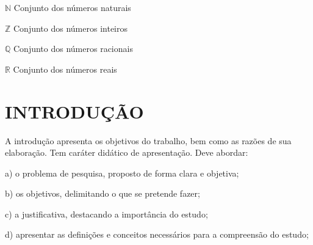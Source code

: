 \documentclass[
	12pt,				%
	oneside,			%
	a4paper,			%
	english,			%
	french,				%
	spanish,			%
	brazil,				%
	]{abntex2}
\newcommand{\C}{\ensuremath {\mathbb{C}} }
\theoremstyle{plain}
\theoremstyle{definition}
\begin{document}
\renewcommand\listadesimbolosname{{\fontsize{12pt}{\baselineskip}\normalfont \bfseries LISTA DE SÍMBOLOS}}
\begin{simbolos}
  \item[$ \mathbb{N} $] Conjunto dos números naturais 
  \item[$ \mathbb{Z} $] Conjunto dos números inteiros 
  \item[$ \mathbb{Q} $] Conjunto dos números racionais 
  \item[$ \mathbb{R} $] Conjunto dos números reais 
\end{simbolos}


\renewcommand\contentsname{{\fontsize{12pt}{\baselineskip}\normalfont \bfseries SUMÁRIO}}
\pdfbookmark[0]{\contentsname}{toc}
\tableofcontents*
\cleardoublepage




\textual

  \pagestyle{meuestilo}

\chapter{INTRODUÇÃO} %


A introdução apresenta os objetivos do trabalho, bem como as razões de sua elaboração. Tem caráter didático de apresentação.
Deve abordar:

    a) o problema de pesquisa, proposto de forma clara e objetiva;
    
    b) os objetivos, delimitando o que se pretende fazer;
    
    c) a justificativa, destacando a importância do estudo;
    
    d) apresentar as definições e conceitos necessários para a compreensão do estudo;
    
\end{document}
